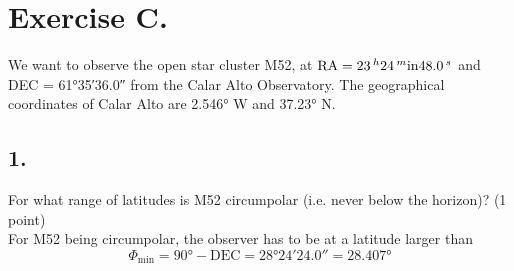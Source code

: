 \documentclass[11pt,a4paper,twoside]{article}
\begin{document}
\section*{Exercise C.}

We want to observe the open star cluster M52, at $ \text{RA} = \SI{23}{^\hour} \SI{24}{^\minute} \SI{48.0}{^\second}$ and DEC = \ang{61;35;36.0} from the Calar Alto Observatory. The geographical coordinates of Calar Alto are \ang{2.546} W and \ang{37.23} N.

\subsection*{1.} For what range of latitudes is M52 circumpolar (i.e. never below the horizon)? (1 point) \\

For M52 being circumpolar, the observer has to be at a latitude larger than 
\begin{equation}
 \Phi_{\text{min}} = \ang{90} - \text{DEC} = \ang{28;24;24.0} = \ang{28.407}
\end{equation}
\end{document}
